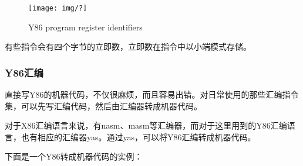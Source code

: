 \begin{figure}[htbp]
\centering
\texttt{[image: img/?]}
\caption{Y86 program register identifiers}
\end{figure}

有些指令会有四个字节的立即数，立即数在指令中以小端模式存储。

\subsubsection{Y86汇编}\label{y86ux6c47ux7f16}

直接写Y86的机器代码，不仅很麻烦，而且容易出错。对日常使用的那些汇编指令集，可以先写汇编代码，然后由汇编器转成机器代码。

对于X86汇编语言来说，有nasm、masm等汇编器，而对于这里用到的Y86汇编语言，也有相应的汇编器yas。通过yas，可以将Y86汇编转成机器代码。

下面是一个Y86转成机器代码的实例：

